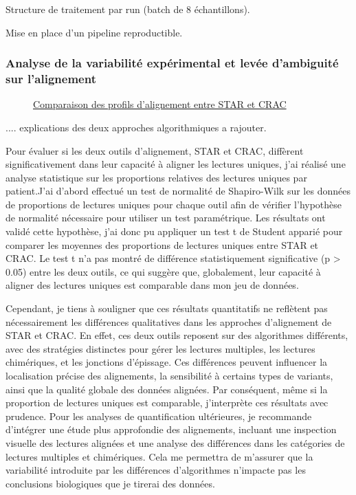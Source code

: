     Structure de traitement par run (batch de 8 échantillons).
    
    Mise en place d’un pipeline reproductible.
    
\subsubsection{Analyse de la variabilité expérimental et levée d'ambiguité sur l'alignement}
\begin{figure}[H]
\begin{center}
    \caption{\underline{Comparaison des profils d'alignement entre STAR et CRAC}}
    \label{fig:mappingp}
\end{center}
\end{figure}

.... explications des deux approches algorithmiques a rajouter.
 

Pour évaluer si les deux outils d’alignement, STAR et CRAC, diffèrent significativement dans leur capacité à aligner les lectures uniques,
 j’ai réalisé une analyse statistique sur les proportions relatives des lectures uniques par patient.J’ai d’abord effectué un test de normalité de Shapiro-Wilk sur les données 
 de proportions de lectures uniques pour chaque outil afin de vérifier l’hypothèse de normalité nécessaire pour utiliser un test paramétrique. 
 Les résultats ont validé cette hypothèse, j’ai donc pu appliquer un test t de Student apparié pour comparer les moyennes des proportions de lectures uniques entre STAR et CRAC. 
 Le test t n’a pas montré de différence statistiquement significative (p > 0.05) entre les deux outils, ce qui suggère que, globalement,
  leur capacité à aligner des lectures uniques est comparable dans mon jeu de données.

Cependant, je tiens à souligner que ces résultats quantitatifs ne reflètent pas nécessairement les différences qualitatives dans les approches d’alignement de STAR et CRAC.
 En effet, ces deux outils reposent sur des algorithmes différents, avec des stratégies distinctes pour gérer les lectures multiples, les lectures chimériques, et les jonctions d’épissage. 
 Ces différences peuvent influencer la localisation précise des alignements, la sensibilité à certains types de variants, ainsi que la qualité globale des données alignées.
Par conséquent, même si la proportion de lectures uniques est comparable, j’interprète ces résultats avec prudence. Pour les analyses de quantification ultérieures,
 je recommande d’intégrer une étude plus approfondie des alignements, incluant une inspection visuelle des lectures alignées et une analyse des différences dans les catégories de lectures multiples 
 et chimériques. Cela me permettra de m’assurer que la variabilité introduite par les différences d’algorithmes n’impacte pas les conclusions biologiques que je tirerai des données.


